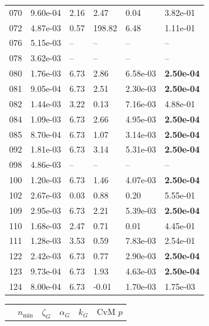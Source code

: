 \begin{figure}[htbp!]
{\begin{minipage}[t]{0.48\linewidth}
\begin{tabular}{llllll}
                    070 & 9.60e-04 & 2.16 & 2.47 & 0.04 & 3.82e-01\\
                    072 & 4.87e-03 & 0.57 & 198.82 & 6.48 & 1.11e-01\\
                    076 & 5.15e-03 & -- & -- & -- & --\\
                    078 & 3.62e-03 & -- & -- & -- & --\\
                    080 & 1.76e-03 & 6.73 & 2.86 & 6.58e-03 & \textbf{2.50e-04}\\
                    081 & 9.05e-04 & 6.73 & 2.51 & 2.30e-03 & \textbf{2.50e-04}\\
                    082 & 1.44e-03 & 3.22 & 0.13 & 7.16e-03 & 4.88e-01\\
                    084 & 1.09e-03 & 6.73 & 2.66 & 4.95e-03 & \textbf{2.50e-04}\\
                    085 & 8.70e-04 & 6.73 & 1.07 & 3.14e-03 & \textbf{2.50e-04}\\
                    092 & 1.81e-03 & 6.73 & 3.14 & 5.31e-03 & \textbf{2.50e-04}\\
                    098 & 4.86e-03 & -- & -- & -- & --\\
                    100 & 1.20e-03 & 6.73 & 1.46 & 4.07e-03 & \textbf{2.50e-04}\\
                    102 & 2.67e-03 & 0.03 & 0.88 & 0.20 & 5.55e-01\\
                    109 & 2.95e-03 & 6.73 & 2.21 & 5.39e-03 & \textbf{2.50e-04}\\
                    110 & 1.68e-03 & 2.47 & 0.71 & 0.01 & 4.45e-01\\
                    111 & 1.28e-03 & 3.53 & 0.59 & 7.83e-03 & 2.54e-01\\
                    122 & 2.42e-03 & 6.73 & 0.77 & 2.90e-03 & \textbf{2.50e-04}\\
                    123 & 9.73e-04 & 6.73 & 1.93 & 4.63e-03 & \textbf{2.50e-04}\\
                    124 & 8.00e-04 & 6.73 & -0.01 & 1.70e-03 & 1.75e-03\\
        \bottomrule
        \end{tabular}
    \end{minipage}
    \hspace{0.02\linewidth}
    \begin{minipage}[t]{0.48\linewidth}
        \centering
        \begin{tabular}{llllll}
        \toprule
         & $n_{\min}$ & $\zeta_G$ & $\alpha_G$ & $k_G$ & CvM $p$ \\

\end{tabular}
\end{minipage}}
\end{figure}
